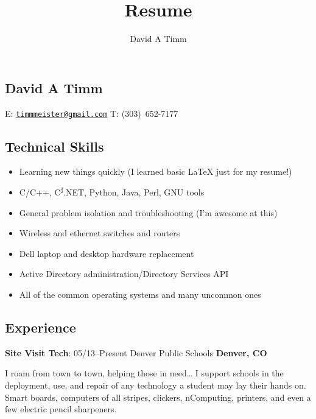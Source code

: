 \documentclass[a4paper,12pt]{article}
\author{David A Timm}
\title{Resume}
\begin{document}
\begin{center}
\section{David A Timm}

E: \href{mailto:timmmeister@gmail.com?subject=You%27re%20hired!}
{\nolinkurl{timmmeister@gmail.com}}
T: \mbox{(303) 652-7177}
\end{center}

\begin{center}
\subsection{Technical Skills}
\end{center}

\begin{itemize}
\item Learning new things quickly (I learned basic \LaTeX{} just for my resume!)
\item C/C++, C\textsuperscript{{$\sharp$}}.NET, Python, Java, Perl, GNU tools
\item General problem isolation and troubleshooting (I'm awesome at this)
\item Wireless and ethernet switches and routers
\item Dell laptop and desktop hardware replacement
\item Active Directory administration/Directory Services API
\item All of the common operating systems and many uncommon ones
\end{itemize}

\begin{center}
\subsection{Experience}
\end{center}

\begin{flushleft}
\textbf{Site Visit Tech}: 05/13--Present Denver Public Schools
\textbf{Denver, CO}
\end{flushleft}

I roam from town to town, helping those in need\ldots{} I support schools in the
deployment, use, and repair of any technology a student may lay their hands on.
Smart boards, computers of all stripes, clickers, nComputing, printers, and
even a few electric pencil sharpeners. 
\end{document}
